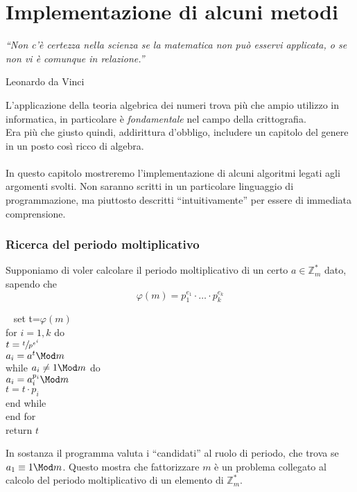 	



\chapter{Implementazione di alcuni metodi}

	\epigraph{\textit{\enquote{Non c'è certezza nella scienza se la matematica non può esservi applicata, o se non vi è comunque in relazione.}}}{Leonardo da Vinci}
	L'applicazione della teoria algebrica dei numeri trova più che ampio utilizzo in informatica, in particolare è \textit{fondamentale} nel campo della crittografia. \\ Era più che giusto quindi, addirittura d'obbligo, includere un capitolo del genere in un posto così ricco di algebra. \\ \\ In questo capitolo mostreremo l'implementazione di alcuni algoritmi legati agli argomenti svolti. Non saranno scritti in un particolare linguaggio di programmazione, ma piuttosto descritti \enquote{intuitivamente} per essere di immediata comprensione. \newpage
	\subsection{Ricerca del periodo moltiplicativo}
	Supponiamo di voler calcolare il periodo moltiplicativo di un certo $a\in\mathbb{Z}_m^*$ dato, sapendo che 
	\begin{equation*}
	\varphi(m)=p_1^{e_1}\cdot\dots\cdot p_k^{e_k}
	\end{equation*}
	\begin{algoritmo} \ \newline
			{\selectfont
			\hspace*{10 mm} set t=$\varphi(m)$\\ 
			\hspace*{10 mm} for $i=1,k$ do \\
			\hspace*{15 mm} $t=\sfrac{t}{p^{e^i}}$\\
			\hspace*{15 mm} $a_i=a^t\Mod m$\\
			\hspace*{15 mm} while $a_i\neq1 \Mod m$ do\\
			\hspace*{20 mm} $a_i=a_i^{p_i}\Mod m$\\
			\hspace*{20 mm} $t=t\cdot p_i$\\
			\hspace*{15 mm} end while\\
			\hspace*{10 mm} end for\\
			\hspace*{10 mm} return $t$}
	\end{algoritmo}
	In sostanza il programma valuta i \enquote{candidati} al ruolo di periodo, che trova se $a_1\equiv1\Mod m$. Questo mostra che fattorizzare $m$ è un problema collegato al calcolo del periodo moltiplicativo di un elemento di $\mathbb{Z}_m^*$. 